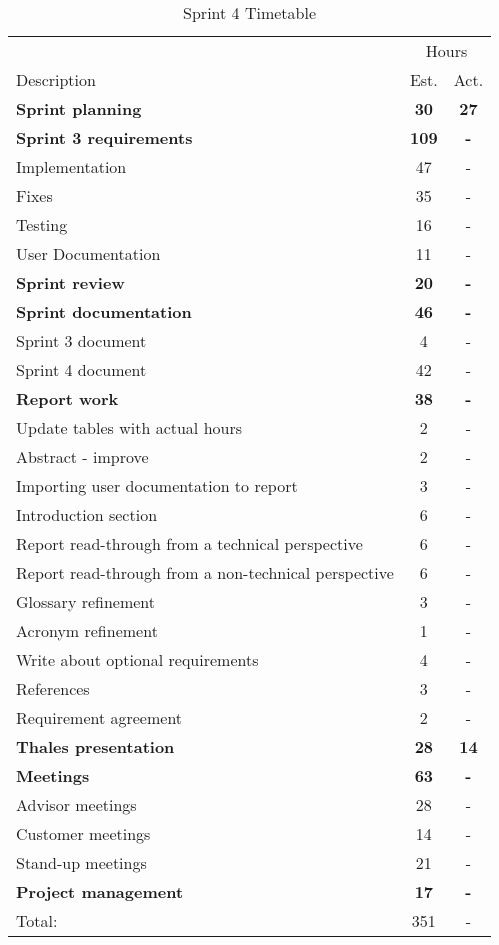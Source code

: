 \begin{table}[!htb] \small \center
\caption{Sprint 4 Timetable\label{tab:sprint4time}}
\begin{tabularx}{\textwidth}{X c c}
	\toprule
	& \multicolumn{2}{c}{Hours} \\
	\cmidrule(r){2-3}
	Description & Est. & Act. \\
	\midrule
	\textbf{Sprint planning} & \textbf{30} & \textbf{27} \\
	\addlinespace
	\textbf{Sprint 3 requirements} & \textbf{109} & \textbf{-} \\
	Implementation & 47 & - \\
	Fixes & 35 & - \\
	Testing & 16 & - \\
	User Documentation & 11 & - \\
	\addlinespace
	\textbf{Sprint review} & \textbf{20} & \textbf{-} \\
	\addlinespace
	\textbf{Sprint documentation} & \textbf{46} & \textbf{-} \\
	Sprint 3 document & 4 & - \\
	Sprint 4 document & 42 & - \\
	\addlinespace
	\textbf{Report work} & \textbf{38} & \textbf{-} \\
	Update tables with actual hours & 2 & - \\
	Abstract - improve & 2 & -\\
	Importing user documentation to report & 3 & -\\
	Introduction section & 6 & -\\
	Report read-through from a technical perspective & 6 & -\\
	Report read-through from a non-technical perspective & 6 & -\\
	Glossary refinement & 3 & -\\
	Acronym refinement & 1 & -\\
	Write about optional requirements & 4 & -\\
	References & 3 & -\\
	Requirement agreement & 2 & -\\
	\addlinespace
	\textbf{Thales presentation} & \textbf{28} & \textbf{14} \\
	\addlinespace
	\textbf{Meetings} & \textbf{63} & \textbf{-} \\
	Advisor meetings & 28 & - \\
	Customer meetings & 14 & - \\
	Stand-up meetings & 21 & - \\
	\addlinespace
	\textbf{Project management} & \textbf{17} & \textbf{-} \\
	\midrule
	Total: & 351 & - \\
	\bottomrule
\end{tabularx}
\end{table}

